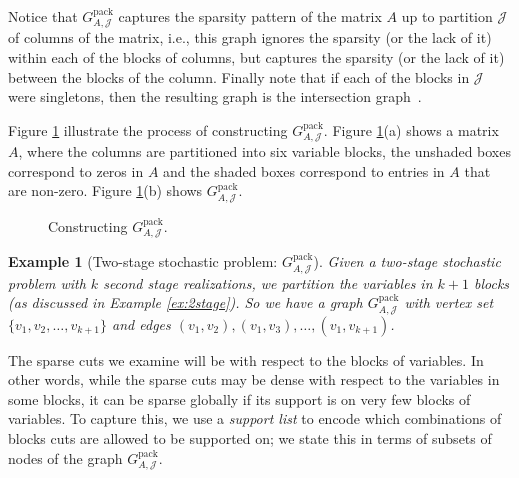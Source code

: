 \documentclass[smallextended]{svjour3}
\newtheorem{example}[proposition]{Example}
\begin{document}
Notice that ${G^{\textrm{pack}}_{A, {\mathcal{J}}}}$ captures the sparsity pattern of the matrix $A$ up to partition $\mathcal{J}$ of columns of the matrix, i.e., this graph ignores the sparsity (or the lack of it) within each of the blocks of columns, but captures the sparsity (or the lack of it) between the blocks of the column. Finally note that if each of the blocks in $\mathcal{J}$ were singletons, then the resulting graph is the intersection graph~\cite{fulkerson:gross:1965}.

Figure \ref{fig1} illustrate the process of constructing ${G^{\textrm{pack}}_{A, {\mathcal{J}}}}$. Figure \ref{fig1}(a) shows a matrix $A$, where the columns are partitioned into six variable blocks, the unshaded boxes correspond to zeros in $A$ and the shaded boxes correspond to entries in $A$ that are non-zero. Figure \ref{fig1}(b) shows ${G^{\textrm{pack}}_{A, {\mathcal{J}}}}$.  

\begin{figure}[t!]
	\centering    
	\caption{Constructing ${G^{\textrm{pack}}_{A, {\mathcal{J}}}}$.
	}  
	\label{fig1}
	\hspace{15pt}
\end{figure}

\begin{example}[Two-stage stochastic problem: ${G^{\textrm{pack}}_{A, {\mathcal{J}}}}$]\label{ex:2stage1}
Given a two-stage stochastic problem with $k$ second stage realizations, we partition the variables in $k + 1$ blocks (as discussed in Example \ref{ex:2stage}). So we have a graph ${G^{\textrm{pack}}_{A, {\mathcal{J}}}}$ with vertex set $\{v_1, v_2, \dots, v_{k + 1}\}$ and edges $(v_1, v_2), (v_1, v_3), \dots, (v_1, v_{k +1})$. 
\end{example}

The sparse cuts we examine will be with respect to the blocks of variables. In other words, while the sparse cuts may be dense with respect to the variables in some blocks, it can be sparse globally if its support is on very few blocks of variables. To capture this, we use a \emph{support list} to encode which combinations of blocks cuts are allowed to be supported on; we state this in terms of subsets of nodes of the graph ${G^{\textrm{pack}}_{A, {\mathcal{J}}}}$.
\end{document}

